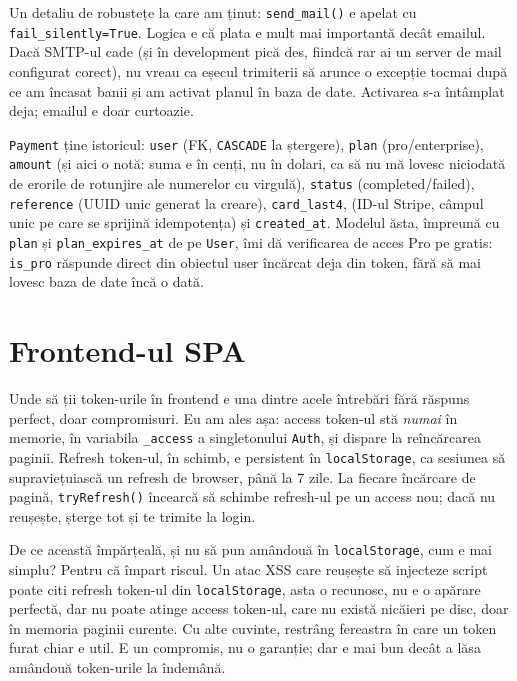 \documentclass[12pt,a4paper]{report}
\begin{document}
Un detaliu de robustețe la care am ținut: \texttt{send\_mail()} e apelat cu
\texttt{fail\_silently=True}. Logica e că plata e mult mai importantă decât emailul.
Dacă SMTP-ul cade (și în development pică des, fiindcă rar ai un server de mail
configurat corect), nu vreau ca eșecul trimiterii să arunce o excepție tocmai după
ce am încasat banii și am activat planul în baza de date. Activarea s-a întâmplat deja;
emailul e doar curtoazie.

\texttt{Payment} ține istoricul: \texttt{user} (FK, \texttt{CASCADE} la ștergere),
\texttt{plan} (pro/enterprise), \texttt{amount} (și aici o notă: suma e în cenți, nu
în dolari, ca să nu mă lovesc niciodată de erorile de rotunjire ale numerelor cu
virgulă), \texttt{status} (completed/failed), \texttt{reference} (UUID unic generat
la creare), \texttt{card\_last4},  (ID-ul Stripe, câmpul
unic pe care se sprijină idempotența) și \texttt{created\_at}. Modelul ăsta, împreună
cu \texttt{plan} și \texttt{plan\_expires\_at} de pe \texttt{User}, îmi dă verificarea
de acces Pro pe gratis: \texttt{is\_pro} răspunde direct din obiectul user încărcat
deja din token, fără să mai lovesc baza de date încă o dată.

\section{Frontend-ul SPA}

Unde să ții token-urile în frontend e una dintre acele întrebări fără răspuns perfect,
doar compromisuri. Eu am ales așa: access token-ul stă \emph{numai} în memorie,
în variabila \texttt{\_access} a singletonului \texttt{Auth}, și dispare la
reîncărcarea paginii. Refresh token-ul, în schimb, e persistent în
\texttt{localStorage}, ca sesiunea să supraviețuiască un refresh de browser, până la 7
zile. La fiecare încărcare de pagină, \texttt{tryRefresh()} încearcă să schimbe
refresh-ul pe un access nou; dacă nu reușește, șterge tot și te trimite la login.

De ce această împărțeală, și nu să pun amândouă în \texttt{localStorage}, cum e mai
simplu? Pentru că împart riscul. Un atac XSS care reușește să injecteze script poate
citi refresh token-ul din \texttt{localStorage}, asta o recunosc, nu e o apărare
perfectă, dar nu poate atinge access token-ul, care nu există nicăieri pe disc, doar
în memoria paginii curente. Cu alte cuvinte, restrâng fereastra în care un token furat
chiar e util. E un compromis, nu o garanție; dar e mai bun decât a lăsa amândouă
token-urile la îndemână.
\end{document}
